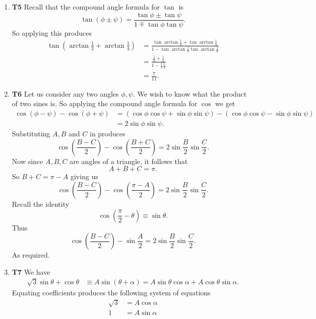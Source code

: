 \documentclass[12pt,oneside]{book}
\begin{document}
\begin{enumerate}
        \item \textbf{T5} Recall that the compound angle formula for $\tan$ is \[
            \tan (\phi \pm \psi) = \frac{\tan \phi \pm \tan \psi}{1 \mp \tan \phi \tan \psi}
        .\]  So applying this produces \begin{align*}
            \tan \left(\arctan \frac{1}{3} + \arctan \frac{1}{4}\right) &= \frac{\tan \arctan \frac{1}{3} + \tan \arctan \frac{1}{4}}{1 - \tan \arctan \frac{1}{3} \tan \arctan \frac{1}{4}} \\
            &= \frac{\frac{1}{3} + \frac{1}{4}}{1 - \frac{1}{3} \frac{1}{4}} \\
            &= \frac{7}{11}.
        \end{align*}
        \item \textbf{T6} Let us consider any two angles $\phi, \psi$. We wish to know what the product of two sines is. So applying the compound angle formula for $\cos$ we get \begin{align*}
            \cos(\phi - \psi) - \cos (\phi + \psi) &= \left( \cos \phi \cos \psi + \sin \phi \sin \psi \right) - \left( \cos \phi \cos \psi - \sin \phi \sin \psi \right) \\
            &= 2 \sin \phi \sin \psi.
        \end{align*}
        Substituting $A, B$ and $C$ in produces \[
            \cos \left( \frac{B - C}{2} \right) - \cos \left( \frac{B + C}{2} \right) = 2 \sin \frac{B}{2} \sin \frac{C}{2}
        .\] Now since $A,B, C$ are angles of a triangle, it follows that \[
            A + B + C = \pi
        .\] So $B + C = \pi - A$ giving us \[
            \cos \left( \frac{B - C}{2} \right) - \cos \left( \frac{\pi - A}{2} \right) = 2 \sin \frac{B}{2} \sin \frac{C}{2}
        .\] Recall the identity \[
            \cos \left(\frac{\pi}{2} - \theta\right) \equiv \sin \theta
        .\] Thus \[
            \cos \left( \frac{B - C}{2} \right) - \sin \frac{A}{2} = 2 \sin \frac{B}{2} \sin \frac{C}{2}
        .\] 
        As required.
        \item \textbf{T7} We have \begin{align*}
            \sqrt{3}\sin \theta + \cos \theta &\equiv A \sin(\theta + \alpha) = A \sin \theta \cos \alpha + A \cos \theta \sin \alpha.
        \end{align*} Equating coefficients produces the following system of equations \begin{align*}
            \sqrt{3} &= A \cos \alpha \\
            1 &= A \sin \alpha

\end{align*}
\end{enumerate}
\end{document}
